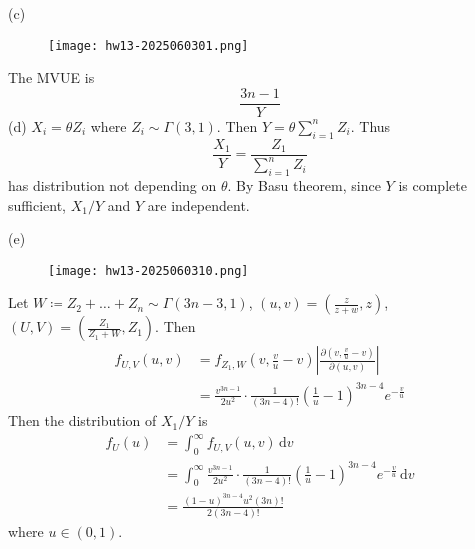 (c)
\begin{figure}[H]
\centering
\texttt{[image: hw13-2025060301.png]}
\label{}
\end{figure}
The MVUE is
\[
\frac{3n-1}{Y}
\]
(d)
$X_i=\theta Z_i$ where $Z_i\sim\Gamma(3,1)$. Then $Y=\theta \sum_{i=1}^{n}Z_i$. Thus
\[
\frac{X_1}{Y}=\frac{Z_1}{\sum_{i=1}^{n} Z_i}
\]
has distribution not depending on $\theta$. By Basu theorem, since $Y$ is complete sufficient, $X_1/Y$ and $Y$ are independent.

(e)
\begin{figure}[H]
\centering
\texttt{[image: hw13-2025060310.png]}
\label{}
\end{figure}
Let $W\coloneqq Z_2+\dots+Z_n\sim\Gamma(3n-3,1)$, $(u,v)=\left( \frac{z}{z+w},z \right)$, $(U,V)=\left( \frac{Z_1}{Z_1+W},Z_1 \right)$. Then
\[
\begin{aligned}
f_{U,V}(u,v) & =f_{Z_1,W}\left( v,\frac{v}{u}-v \right)\left\lvert  \frac{ \partial \left( v,\frac{v}{u}-v \right) }{ \partial (u,v) }   \right\rvert  \\
 & =\frac{v^{3n-1}}{2u^2}\cdot\frac{1}{(3n-4)!}\left( \frac{1}{u}-1 \right)^{3n-4}e^{ -\frac{v}{u} }
\end{aligned}
\]
Then the distribution of $X_1/Y$ is
\[
\begin{aligned}
f_{U}(u) & =\int_{0}^{\infty} f_{U,V}(u,v) \, \mathrm{d}v \\
 & =\int_{0}^{\infty} \frac{v^{3n-1}}{2u^2}\cdot\frac{1}{(3n-4)!}\left( \frac{1}{u}-1 \right)^{3n-4}e^{ -\frac{v}{u} } \, \mathrm{d}v   \\
 & =\frac{(1-u)^{3n-4}u^2(3n)!}{2(3n-4)!}
\end{aligned}
\]
where $u\in(0,1)$.
